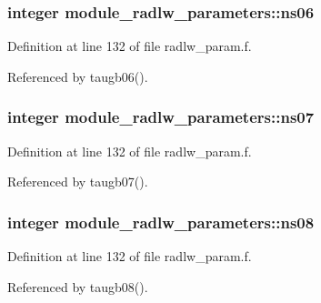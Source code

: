 \subsubsection[{\texorpdfstring{ns06}{ns06}}]{\setlength{\rightskip}{0pt plus 5cm}integer module\+\_\+radlw\+\_\+parameters\+::ns06}\hypertarget{namespacemodule__radlw__parameters_ab936172cdf831f0b956c1475f175eca2}{}\label{namespacemodule__radlw__parameters_ab936172cdf831f0b956c1475f175eca2}


Definition at line 132 of file radlw\+\_\+param.\+f.



Referenced by taugb06().

\subsubsection[{\texorpdfstring{ns07}{ns07}}]{\setlength{\rightskip}{0pt plus 5cm}integer module\+\_\+radlw\+\_\+parameters\+::ns07}\hypertarget{namespacemodule__radlw__parameters_ac60030c5a4655c6cee7be71dd527ffdc}{}\label{namespacemodule__radlw__parameters_ac60030c5a4655c6cee7be71dd527ffdc}


Definition at line 132 of file radlw\+\_\+param.\+f.



Referenced by taugb07().

\subsubsection[{\texorpdfstring{ns08}{ns08}}]{\setlength{\rightskip}{0pt plus 5cm}integer module\+\_\+radlw\+\_\+parameters\+::ns08}\hypertarget{namespacemodule__radlw__parameters_a0a9944341bfe4507370bb6b617ac0476}{}\label{namespacemodule__radlw__parameters_a0a9944341bfe4507370bb6b617ac0476}


Definition at line 132 of file radlw\+\_\+param.\+f.



Referenced by taugb08().

